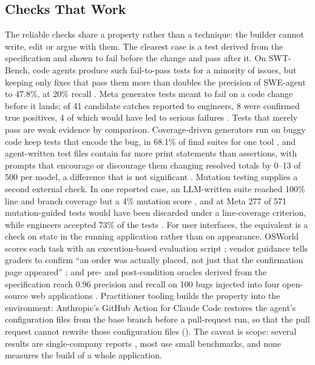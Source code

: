\subsection{Checks That Work}

The reliable checks share a property rather than a technique: the builder cannot write, edit or argue with them. The clearest case is a test derived from the specification and shown to fail before the change and pass after it. On SWT-Bench, code agents produce such fail-to-pass tests for a minority of issues, but keeping only fixes that pass them more than doubles the precision of SWE-agent to 47.8\%, at 20\% recall \citep{V2}. Meta generates tests meant to fail on a code change before it lands; of 41 candidate catches reported to engineers, 8 were confirmed true positives, 4 of which would have led to serious failures \citep{V21}. Tests that merely pass are weak evidence by comparison. Coverage-driven generators run on buggy code keep tests that encode the bug, in 68.1\% of final suites for one tool \citep{V5}, and agent-written test files contain far more print statements than assertions, with prompts that encourage or discourage them changing resolved totals by 0--13 of 500 per model, a difference that is not significant \citep{V1}. Mutation testing supplies a second external check. In one reported case, an LLM-written suite reached 100\% line and branch coverage but a 4\% mutation score \citep{V19}, and at Meta 277 of 571 mutation-guided tests would have been discarded under a line-coverage criterion, while engineers accepted 73\% of the tests \citep{V4}. For user interfaces, the equivalent is a check on state in the running application rather than on appearance. OSWorld scores each task with an execution-based evaluation script \citep{V10}; vendor guidance tells graders to confirm ``an order was actually placed, not just that the confirmation page appeared'' \citep{V16}; and pre- and post-condition oracles derived from the specification reach 0.96 precision and recall on 100 bugs injected into four open-source web applications \citep{V28}. Practitioner tooling builds the property into the environment: Anthropic's GitHub Action for Claude Code restores the agent's configuration files from the base branch before a pull-request run, so that the pull request cannot rewrite those configuration files (). The caveat is scope: several results are single-company reports \citep{V4,V21}, most use small benchmarks, and none measures the build of a whole application.

